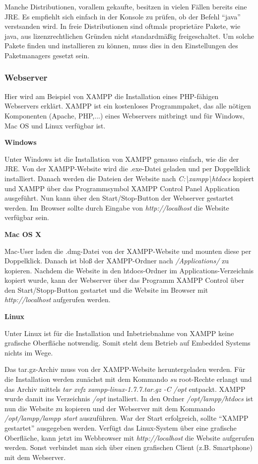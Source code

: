 \documentclass[a4paper,14pt,headsepline]{scrartcl}
\begin{document}
Manche Distributionen, vorallem gekaufte, besitzen in vielen Fällen bereits eine JRE. Es empfiehlt sich einfach in der Konsole zu prüfen, ob der Befehl ``java'' verstsanden wird. In freie Distributionen sind oftmals proprietäre Pakete, wie java, aus lizenzrechtlichen Gründen nicht standardmäßig freigeschaltet. Um solche Pakete finden und installieren zu können, muss dies in den Einstellungen des Paketmanagers gesetzt sein.  

\newpage

\subsubsection{Webserver}
Hier wird am Beispiel von XAMPP die Installation eines PHP-fähigen Webservers erklärt. XAMPP ist ein kostenloses Programmpaket, das alle nötigen Komponenten (Apache, PHP,...) eines Webservers mitbringt und für Windows, Mac OS und Linux verfügbar ist. 

\textbf{Windows}

Unter Windows ist die Installation von XAMPP genauso einfach, wie die der JRE. Von der XAMPP-Website wird die .exe-Datei geladen und per Doppelklick installiert. Danach werden die Dateien der Website nach \textit{C:\textbackslash xampp\textbackslash htdocs} kopiert und XAMPP über das Programmsymbol XAMPP Control Panel Application ausgeführt. Nun kann über den Start/Stop-Button der Webserver gestartet werden. Im Browser sollte durch Eingabe von \textit{http://localhost} die Website verfügbar sein. 

\textbf{Mac OS X}

Mac-User laden die .dmg-Datei von der XAMPP-Website und mounten diese per Doppelklick. Danach ist bloß der XAMPP-Ordner nach \textit{/Applications/} zu kopieren. Nachdem die Website in den htdocs-Ordner im Applications-Verzeichnis kopiert wurde, kann der Webserver über das Programm XAMPP Control über den Start/Stopp-Button gestartet und die Website im Browser mit \textit{http://localhost} aufgerufen werden. 

\newpage

\textbf{Linux}

Unter Linux ist für die Installation und Inbetriebnahme von XAMPP keine grafische Oberfläche notwendig. Somit steht dem Betrieb auf Embedded Systems nichts im Wege. 

Das tar.gz-Archiv muss von der XAMPP-Website heruntergeladen werden. Für die Installation werden zunächst mit dem Kommando \textit{su} root-Rechte erlangt und das Archiv mittels \textit{tar xvfz xampp-linux-1.7.7.tar.gz -C /opt} entpackt. XAMPP wurde damit ins Verzeichnis \textit{/opt} installiert. In den Ordner \linebreak \textit{/opt/lampp/htdocs} ist nun die Website zu kopieren und der Webserver mit dem Kommando \textit{/opt/lampp/lampp start} auszuführen. War der Start erfolgreich, sollte ``XAMPP gestartet'' ausgegeben werden. Verfügt das Linux-System über eine grafische Oberfläche, kann jetzt im Webbrowser mit \textit{http://localhost} die Website aufgerufen werden. Sonst verbindet man sich über einen grafischen Client (z.B. Smartphone) mit dem Webserver.
 
\end{document}
